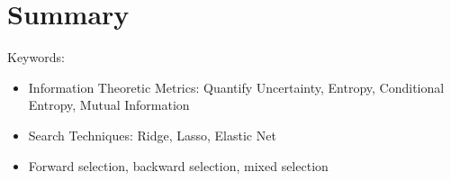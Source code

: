 \documentclass[twoside,12pt]{article}
\begin{document}

\section{Summary}
Keywords:
\begin{itemize}
\item Information Theoretic Metrics: Quantify Uncertainty, Entropy, Conditional Entropy, Mutual Information 
\item Search Techniques: Ridge, Lasso, Elastic Net
\item Forward selection, backward selection, mixed selection
\end{itemize}
\end{document}
